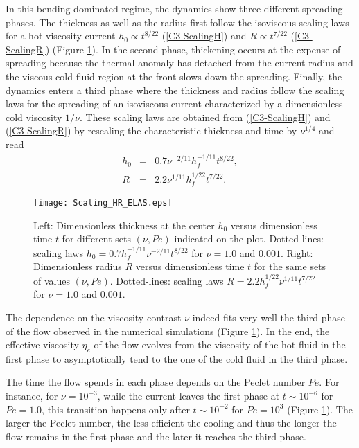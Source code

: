 In this  bending dominated regime,  the dynamics show  three different
spreading phases.   The thickness as  well as the radius  first follow
the   isoviscous   scaling   laws   for  a   hot   viscosity   current
$h_0\propto  t^{8/22}$  (\ref{C3-ScalingH})  and  $R\propto  t^{7/22}$
(\ref{C3-ScalingR}) (Figure \ref{C3-Scaling_HR_ELAS}).   In the second
phase,  thickening occurs  at  the expense  of  spreading because  the
thermal anomaly has  detached from the current radius  and the viscous
cold fluid region at the front slows down the spreading.  Finally, the
dynamics enters  a third phase  where the thickness and  radius follow
the  scaling  laws   for  the  spreading  of   an  isoviscous  current
characterized by a dimensionless cold viscosity $1/\nu$. These scaling
laws are obtained from  (\ref{C3-ScalingH}) and (\ref{C3-ScalingR}) by
rescaling  the characteristic  thickness and  time by  $\nu^{1/4}$ and
read
\begin{eqnarray}
  h_{0} & = &0.7 \nu^{-2/11} h_f^{-1/11}t^{8/22}\label{C3-ScalingH-Visco},\\
  R& = & 2.2 \nu^{1/11}h_f^{1/22} t^{7/22}\label{C3-ScalingR-Visco}.
\end{eqnarray}
\begin{figure}[h!]
  \begin{center}
    \graphicspath{ {/Users/thorey/Documents/These/Projet/Refroidissement/Skin_Model/Figure/JFM_V13/} }
    \texttt{[image: Scaling\_HR\_ELAS.eps]}
    \caption{Left: Dimensionless thickness at  the center $h_0$ versus
      dimensionless time  $t$ for different sets  $(\nu,Pe)$ indicated
      on      the      plot.      Dotted-lines:      scaling      laws
      $h_0=  0.7h_f^{-1/11}\nu^{-2/11}t^{8/22}$ for  $\nu  = 1.0$  and
      $0.001$.  Right:  Dimensionless radius $R$  versus dimensionless
      time $t$ for the same  sets of values $(\nu,Pe)$.  Dotted-lines:
      scaling    laws    $R=   2.2h_f^{1/22}\nu^{1/11}t^{7/22}$    for
      $\nu = 1.0$ and $0.001$.}
    \label{C3-Scaling_HR_ELAS}
  \end{center}
\end{figure}
The dependence on  the viscosity contrast $\nu$ indeed  fits very well
the  third phase  of the  flow observed  in the  numerical simulations
(Figure   \ref{C3-Scaling_HR_ELAS}).   In   the  end,   the  effective
viscosity $\eta_e$ of  the flow evolves from the viscosity  of the hot
fluid in the first phase to asymptotically tend to the one of the cold
fluid in the third phase.

The time  the flow spends in  each phase depends on  the Peclet number
$Pe$.  For instance,  for $\nu=10^{-3}$, while the  current leaves the
first phase at $t \sim 10^{-6}$ for $Pe =1.0$, this transition happens
only   after   $t   \sim   10^{-2}$    for   $Pe   =   10^3$   (Figure
\ref{C3-Scaling_HR_ELAS}).   The larger  the Peclet  number, the  less
efficient the  cooling and  thus the  longer the  flow remains  in the
first phase and the later it reaches the third phase.

